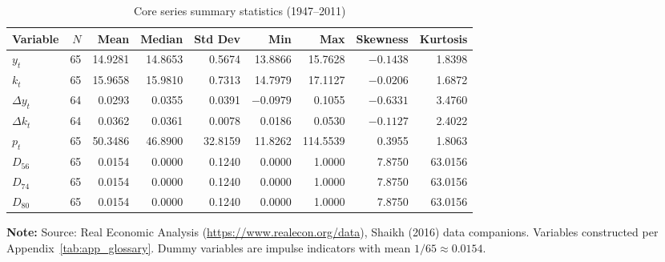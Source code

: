 \begin{longtable}[t]{lrrrrrrrr}
\caption{Core series summary statistics (1947--2011)}\label{tab:app_summary_stats}\\
\toprule
Variable & $N$ & Mean & Median & Std Dev & Min & Max & Skewness & Kurtosis \\
\midrule
$y_t$ & 65 & 14.9281 & 14.8653 & 0.5674 & 13.8866 & 15.7628 & $-0.1438$ & 1.8398 \\
$k_t$ & 65 & 15.9658 & 15.9810 & 0.7313 & 14.7979 & 17.1127 & $-0.0206$ & 1.6872 \\
$\Delta y_t$ & 64 & 0.0293 & 0.0355 & 0.0391 & $-0.0979$ & 0.1055 & $-0.6331$ & 3.4760 \\
$\Delta k_t$ & 64 & 0.0362 & 0.0361 & 0.0078 & 0.0186 & 0.0530 & $-0.1127$ & 2.4022 \\
$p_t$ & 65 & 50.3486 & 46.8900 & 32.8159 & 11.8262 & 114.5539 & 0.3955 & 1.8063 \\
\addlinespace
$D_{56}$ & 65 & 0.0154 & 0.0000 & 0.1240 & 0.0000 & 1.0000 & 7.8750 & 63.0156 \\
$D_{74}$ & 65 & 0.0154 & 0.0000 & 0.1240 & 0.0000 & 1.0000 & 7.8750 & 63.0156 \\
$D_{80}$ & 65 & 0.0154 & 0.0000 & 0.1240 & 0.0000 & 1.0000 & 7.8750 & 63.0156 \\
\bottomrule
\end{longtable}
\noindent\footnotesize\textbf{Note:} Source: Real Economic Analysis (\url{https://www.realecon.org/data}), Shaikh (2016) data companions. Variables constructed per Appendix~\ref{tab:app_glossary}. Dummy variables are impulse indicators with mean $1/65 \approx 0.0154$.